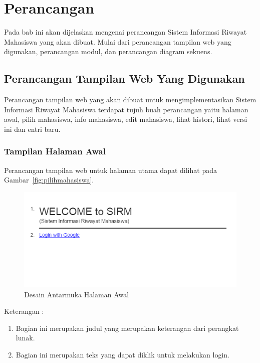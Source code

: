 \chapter{Perancangan}
\label{chap:perancangan}

Pada bab ini akan dijelaskan mengenai perancangan Sistem Informasi Riwayat Mahasiswa yang akan dibuat. Mulai dari perancangan tampilan web yang digunakan, perancangan modul, dan perancangan diagram sekuens.


\section{Perancangan Tampilan Web Yang Digunakan}
\label{sec:perancanganantarmuka}

Perancangan tampilan web yang akan dibuat untuk mengimplementasikan Sistem
Informasi Riwayat Mahasiswa terdapat tujuh buah perancangan yaitu halaman
awal, pilih mahasiswa, info mahasiswa, edit mahasiswa, lihat histori, lihat
versi ini dan entri baru.

\subsection{Tampilan Halaman Awal}
Perancangan tampilan web untuk halaman utama dapat dilihat pada
Gambar~\ref{fig:pilihmahasiswa}.

\begin{figure}[H]
\centering
\includegraphics[scale=0.5]{Gambar/halamanawal.png}
\caption[Desain Antarmuka Halaman Awal]{Desain Antarmuka Halaman Awal}
\label{fig:halamanawal}
\end{figure}

Keterangan :
\begin{enumerate}[(1)]
\item
Bagian ini merupakan judul yang merupakan keterangan dari perangkat lunak.
\item
Bagian ini merupakan teks yang dapat diklik untuk melakukan login.
\end{enumerate}

